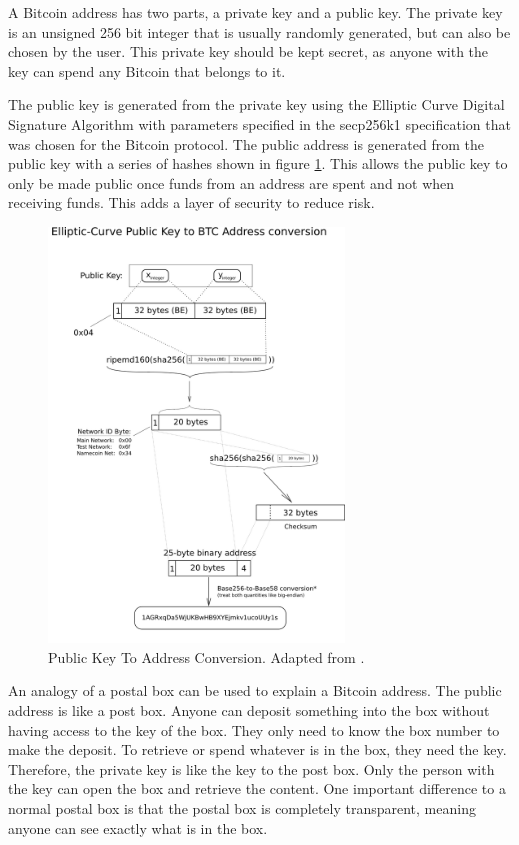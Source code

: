 A Bitcoin address has two parts, a private key and a public key. The private key is an unsigned 256 bit integer that is usually randomly generated, but can also be chosen by the user. This private key should be kept secret, as anyone with the key can spend any Bitcoin that belongs to it.

The public key is generated from the private key using the Elliptic Curve Digital Signature Algorithm\cite{Johnson2001} with parameters specified in the secp256k1 specification \cite{bwSecp}\cite{Research2010} that was chosen for the Bitcoin protocol. The public address is generated from the public key with a series of hashes shown in figure \ref{fig:PubKeyToAddr}. This allows the public key to only be made public once funds from an address are spent and not when receiving funds. This adds a layer of security to reduce risk.

\begin{figure}
  \centering
  	\caption{Public Key To Address Conversion. Adapted from \cite{pubkeytoadd}.} 
    \includegraphics[width=0.7\textwidth]{figs/PubKeyToAddr.png}
   
   \label{fig:PubKeyToAddr}
\end{figure}

An analogy of a postal box can be used to explain a Bitcoin address. The public address is like a post box. Anyone can deposit something into the box without having access to the key of the box. They only need to know the box number to make the deposit. To retrieve or spend whatever is in the box, they need the key. Therefore, the private key is like the key to the post box. Only the person with the key can open the box and retrieve the content. One important difference to a normal postal box is that the postal box is completely transparent, meaning anyone can see exactly what is in the box.

